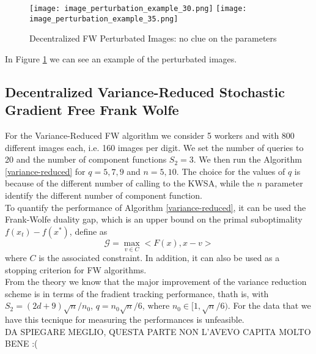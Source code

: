 \begin{figure}[htbp]
	\centering
	\texttt{[image: image\_perturbation\_example\_30.png]}\hfil
	\texttt{[image: image\_perturbation\_example\_35.png]}
	\caption{Decentralized FW Perturbated Images: no clue on the parameters}
	\label{fig:decentralized}
\end{figure}
In Figure \ref{fig:decentralized} we can see an example of the perturbated images.

\subsection{Decentralized Variance-Reduced Stochastic Gradient Free Frank Wolfe}
For the Variance-Reduced FW algorithm we consider 5 workers and with 800 different images each, i.e. 160 images per digit. We set the number of queries to 20 and the number of component functions $S_2 = 3$. We then run the Algorithm \ref{variance-reduced} for $q=5,7,9$ and $n=5,10$. The choice for the values of $q$ is because of the different number of calling to the KWSA, while the $n$ parameter identify the different number of component function.\\
To quantify the performance of Algorithm \ref{variance-reduced}, it can be used the Frank-Wolfe duality gap, which is an upper bound on the primal suboptimality $f(x_t)-f(x^*)$, define as
\[ \mathcal{G} = \max_{v \in C} <F(x),x-v> \]
where $C$ is the associated constraint. In addition, it can also be used as a stopping criterion for FW algorithms.\\
From the theory we know that the major improvement of the variance reduction scheme is in terms of the fradient tracking performance, thath is, with $S_2 = (2d+9)\sqrt{n}/n_0$, $q = n_0 \sqrt{n}/6$, where $n_0 \in [1, \sqrt{n}/6)$. For the data that we have this tecnique for measuring the performances is unfeasible.\\

DA SPIEGARE MEGLIO, QUESTA PARTE NON L'AVEVO CAPITA MOLTO BENE :(

